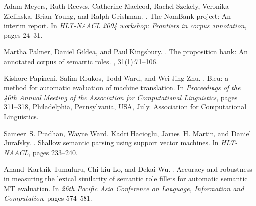 \documentclass[11pt,twocolumn]{article}
\begin{document}
\begin{thebibliography}{}
Adam Meyers, Ruth Reeves, Catherine Macleod, Rachel Szekely, Veronika
  Zielinska, Brian Young, and Ralph Grishman.
.
\newblock The {NomBank} project: An interim report.
\newblock In {\em HLT-NAACL 2004 workshop: Frontiers in corpus annotation},
  pages 24--31.

Martha Palmer, Daniel Gildea, and Paul Kingsbury.
.
\newblock The proposition bank: An annotated corpus of semantic roles.
, 31(1):71--106.

Kishore Papineni, Salim Roukos, Todd Ward, and Wei-Jing Zhu.
.
\newblock Bleu: a method for automatic evaluation of machine translation.
\newblock In {\em Proceedings of the 40th Annual Meeting of the Association for
  Computational Linguistics}, pages 311--318, Philadelphia, Pennsylvania, USA,
  July. Association for Computational Linguistics.

Sameer~S. Pradhan, Wayne Ward, Kadri Hacioglu, James~H. Martin, and Daniel
  Jurafsky.
.
\newblock Shallow semantic parsing using support vector machines.
\newblock In {\em HLT-NAACL}, pages 233--240.

Anand~Karthik Tumuluru, Chi{-}kiu Lo, and Dekai Wu.
.
\newblock Accuracy and robustness in measuring the lexical similarity of
  semantic role fillers for automatic semantic {MT} evaluation.
\newblock In {\em 26th {Pacific} {Asia} Conference on Language, Information and
  Computation}, pages 574--581.

\end{thebibliography}
\end{document}
